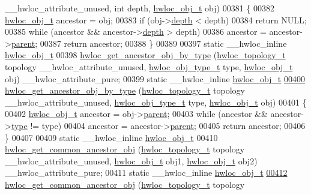 \begin{DoxyCode}
      \_\_hwloc\_attribute\_unused, \textcolor{keywordtype}{int} depth, \hyperlink{a00238}{hwloc\_obj\_t} obj)
00381 \{
00382   \hyperlink{a00238}{hwloc\_obj\_t} ancestor = obj;
00383   \textcolor{keywordflow}{if} (obj->\hyperlink{a00238_a4876fd165b4fff35521f07ebd85355ed}{depth} < depth)
00384     \textcolor{keywordflow}{return} NULL;
00385   \textcolor{keywordflow}{while} (ancestor && ancestor->\hyperlink{a00238_a4876fd165b4fff35521f07ebd85355ed}{depth} > depth)
00386     ancestor = ancestor->\hyperlink{a00238_adc494f6aed939992be1c55cca5822900}{parent};
00387   \textcolor{keywordflow}{return} ancestor;
00388 \}
00389 
00397 \textcolor{keyword}{static} \_\_hwloc\_inline \hyperlink{a00238}{hwloc\_obj\_t}
00398 \hyperlink{a00197_ga70f0c7583291da707c15ae4daa850f41}{hwloc\_get\_ancestor\_obj\_by\_type} (\hyperlink{a00186_ga9d1e76ee15a7dee158b786c30b6a6e38}{hwloc\_topology\_t} topology 
      \_\_hwloc\_attribute\_unused, \hyperlink{a00184_gacd37bb612667dc437d66bfb175a8dc55}{hwloc\_obj\_type\_t} type, \hyperlink{a00238}{hwloc\_obj\_t} obj) 
      \_\_hwloc\_attribute\_pure;
00399 \textcolor{keyword}{static} \_\_hwloc\_inline \hyperlink{a00238}{hwloc\_obj\_t}
\hyperlink{a00197_ga70f0c7583291da707c15ae4daa850f41}{00400} \hyperlink{a00197_ga70f0c7583291da707c15ae4daa850f41}{hwloc\_get\_ancestor\_obj\_by\_type} (\hyperlink{a00186_ga9d1e76ee15a7dee158b786c30b6a6e38}{hwloc\_topology\_t} topology 
      \_\_hwloc\_attribute\_unused, \hyperlink{a00184_gacd37bb612667dc437d66bfb175a8dc55}{hwloc\_obj\_type\_t} type, \hyperlink{a00238}{hwloc\_obj\_t} obj)
00401 \{
00402   \hyperlink{a00238}{hwloc\_obj\_t} ancestor = obj->\hyperlink{a00238_adc494f6aed939992be1c55cca5822900}{parent};
00403   \textcolor{keywordflow}{while} (ancestor && ancestor->\hyperlink{a00238_acc4f0803f244867e68fe0036800be5de}{type} != type)
00404     ancestor = ancestor->\hyperlink{a00238_adc494f6aed939992be1c55cca5822900}{parent};
00405   \textcolor{keywordflow}{return} ancestor;
00406 \}
00407 
00409 \textcolor{keyword}{static} \_\_hwloc\_inline \hyperlink{a00238}{hwloc\_obj\_t}
00410 \hyperlink{a00197_gab1fa883021928b5c476911c4102e9be3}{hwloc\_get\_common\_ancestor\_obj} (\hyperlink{a00186_ga9d1e76ee15a7dee158b786c30b6a6e38}{hwloc\_topology\_t} topology 
      \_\_hwloc\_attribute\_unused, \hyperlink{a00238}{hwloc\_obj\_t} obj1, \hyperlink{a00238}{hwloc\_obj\_t} obj2) \_\_hwloc\_attribute\_pure;
00411 \textcolor{keyword}{static} \_\_hwloc\_inline \hyperlink{a00238}{hwloc\_obj\_t}
\hyperlink{a00197_gab1fa883021928b5c476911c4102e9be3}{00412} \hyperlink{a00197_gab1fa883021928b5c476911c4102e9be3}{hwloc\_get\_common\_ancestor\_obj} (\hyperlink{a00186_ga9d1e76ee15a7dee158b786c30b6a6e38}{hwloc\_topology\_t} topology 

\end{DoxyCode}
